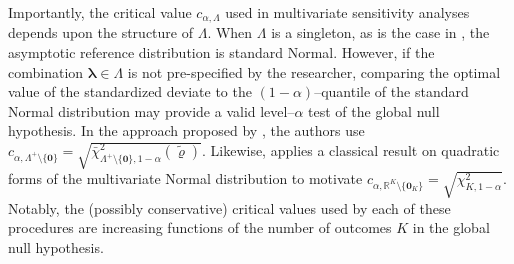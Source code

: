 \documentclass[12pt,leqno,titlepage]{amsart}
\newcommand{\1}{\mathbbm{1}}
\begin{document}
\begin{bibunit}
Importantly, the critical value $c_{\alpha,\Lambda}$ used in multivariate sensitivity analyses depends upon the structure of $\Lambda$. When $\Lambda$ is a singleton, as is the case in \cite{rosenbaum1997signed}, the asymptotic reference distribution is standard Normal. However, if the combination $\boldsymbol{\lambda} \in \Lambda$ is not pre-specified by the researcher, comparing the optimal value of the standardized deviate to the $(1-\alpha)$--quantile of the standard Normal distribution may provide a valid level--$\alpha$ test of the global null hypothesis. In the approach proposed by \cite{cohen2020multivariate}, the authors use $c_{\alpha,\Lambda^+ \setminus\{\mathbf{0}\}} = \sqrt{\bar{\chi}^2_{\Lambda^+\setminus\{\mathbf{0}\}, 1-\alpha}(\tilde{\boldsymbol{\varrho}})}.$ Likewise, \cite{rosenbaum2016using} applies a classical result on quadratic forms of the multivariate Normal distribution to motivate $c_{\alpha,\mathbb{R}^K \setminus\{\mathbf{0}_K\}} = \sqrt{{\chi}^2_{K, 1-\alpha}}$. Notably, the (possibly conservative) critical values used by each of these procedures are increasing functions of the number of outcomes $K$ in the global null hypothesis.



\end{bibunit}
\end{document}

